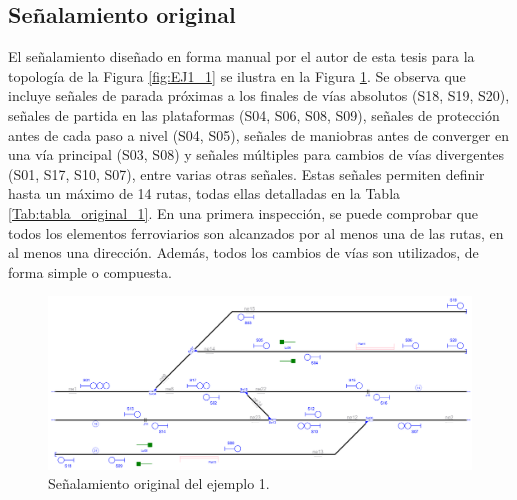 \subsection{Señalamiento original}

    El señalamiento diseñado en forma manual por el autor de esta tesis para la topología de la Figura \ref{fig:EJ1_1} se ilustra en la Figura \ref{fig:EJ1_2}. Se observa que incluye señales de parada próximas a los finales de vías absolutos (S18, S19, S20), señales de partida en las plataformas (S04, S06, S08, S09), señales de protección antes de cada paso a nivel (S04, S05), señales de maniobras antes de converger en una vía principal (S03, S08) y señales múltiples para cambios de vías divergentes (S01, S17, S10, S07), entre varias otras señales. Estas señales permiten definir hasta un máximo de 14 rutas, todas ellas detalladas en la Tabla \ref{Tab:tabla_original_1}. En una primera inspección, se puede comprobar que todos los elementos ferroviarios son alcanzados por al menos una de las rutas, en al menos una dirección. Además, todos los cambios de vías son utilizados, de forma simple o compuesta. 
    
    \begin{figure}[H]
    	\centering
    	\includegraphics[width=1\textwidth]{resultados-obtenidos/ejemplo1/images/1_original.png}
    	\centering\caption{Señalamiento original del ejemplo 1.}
    	\label{fig:EJ1_2}
    \end{figure}
    
